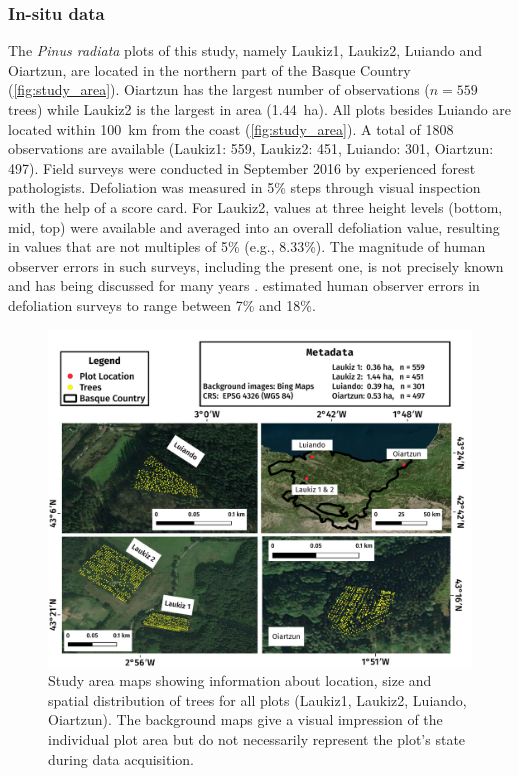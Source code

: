 \documentclass[remotesensing,article,submit,moreauthors,pdftex]{Definitions/mdpi}
\begin{document}
\subsubsection{In-situ data}

The \textit{Pinus radiata} plots of this study, namely Laukiz1, Laukiz2, Luiando and Oiartzun, are located in the northern part of the Basque Country (\autoref{fig:study_area}).
Oiartzun has the largest number of observations ($n = 559$ trees) while Laukiz2 is the largest in area (1.44~ha).
All plots besides Luiando are located within 100~km from the coast (\autoref{fig:study_area}).
A total of 1808 observations are available (Laukiz1: 559, Laukiz2: 451, Luiando: 301, Oiartzun: 497).
Field surveys were conducted in September 2016 by experienced forest pathologists.
Defoliation was measured in 5\% steps through visual inspection with the help of a score card.
For Laukiz2, values at three height levels (bottom, mid, top) were available and averaged into an overall defoliation value, resulting in values that are not multiples of 5\% (e.g., 8.33\%).
The magnitude of human observer errors in such surveys, including the present one, is not precisely known and has being discussed for many years \cite{innes1993}.
\cite{maclean1982} estimated human observer errors in defoliation surveys to range between 7\% and 18\%.

\begin{figure} [ht!]
	\begin{center}
		\centering
		\includegraphics[width=\textwidth] {study-area-hyperspectral.pdf}
		\caption{Study area maps showing information about location, size and spatial distribution of trees for all plots (Laukiz1, Laukiz2, Luiando, Oiartzun). The background maps give a visual impression of the individual plot area but do not necessarily represent the plot's state during data acquisition.}\label{fig:study_area}
	\end{center}
\end{figure}
\end{document}
